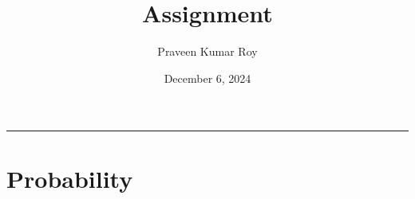 \documentclass[11pt,twoside,reqno]{article}
\date{December 6, 2024}
\begin{document}
\title{Assignment}
\author{Praveen Kumar Roy}
\maketitle
\hrule


\section{Probability}

\begin{comment}
({\bf Answer-1}) $N$ takes on values from the set $\{1,2,3,\ldots \}$ with 
\begin{eqnarray*}
P(N = 1) &=& P(\{H\}) = \frac{1}{2}, \\
P(N = 2) &=& P(\{TH\}) = \frac{1}{2}\cdot \frac{1}{2} \\
&...& \\
P(N = k) &=& P(\{T...TH\}) = \left(\frac{1}{2}\right)^{k-1}\cdot \frac{1}{2}.
\end{eqnarray*}
Therefore, $N$ is a geometric random variable and its expectation is 
\begin{eqnarray*}
E[N] = \sum\limits_{k=1}^{\infty} kP(N=k) = \sum\limits_{k=1}^{\infty} k \left(\frac{1}{2}\right)^{k-1}\cdot \frac{1}{2} =  \sum\limits_{k=1}^{\infty} k \left(\frac{1}{2}\right)^{k}.
\end{eqnarray*}
Substituting $s := \sum\limits_{k=1}^{\infty} k \left(\frac{1}{2}\right)^{k}$, we observe 
\begin{eqnarray*}
s = \frac{1}{2}\left(s + \left(1-\frac{1}{2}\right)^{-1}\right),
\end{eqnarray*}
which gives $E[N] = s = 2$.\\
Variance of $N$ is given by $\sigma^2 : = {\rm Var}(N) = E[(N - E[N])^2] = E[N^2] - 4E[N] + 4 = E[N^2] - 4$. Now using the identity 
\[
\sum_{k=1}^{\infty} k^2 x^k = \frac{x(1+x)}{(1-x)^3}
\]
we get $E[N^2] = 6$. Therefore, $\sigma^2 = 2$ and the standard deviation $\sigma = \sqrt{2}$.\\ \\ 
({\bf Answer-2}) 
(a) If $Y= 5X + 10$, then 
\begin{eqnarray*}
F_Y(a) = P(Y\leq a) = P(5X + 10 \leq a) = P(X \leq \frac{a-10}{5}) = F_X\left(\frac{a-10}{5}\right) = \int_{0}^{\frac{a-10}{5}} \frac{1}{5}dx. 
\end{eqnarray*}
Substituting $v = 5x + 10$, we get $dv = 5 dx$. The above integral now becomes:
\[
F_Y(a) = \int_{10}^{a} \frac{1}{5}\cdot \frac{1}{5}dv = \int_{10}^{a} \frac{1}{25}dv.
\]
Therefore, the probability density functions of $Y$ is 

\end{comment}
\end{document}

